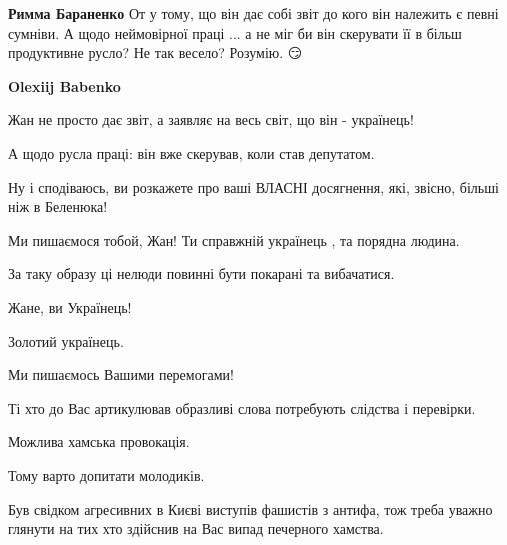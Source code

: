 \begin{itemize}
\begin{itemize}
\textbf{Римма Бараненко} От у тому, що він дає собі звіт до кого він належить є
певні сумніви. А щодо неймовірної праці ... а не міг би він скерувати її в
більш продуктивне русло? Не так весело? Розумію. 😏

 
\textbf{Olexiij Babenko} 

Жан не просто дає звіт, а заявляє на весь світ, що він - українець!

А щодо русла праці: він вже скерував, коли став депутатом.

Ну і сподіваюсь, ви розкажете про ваші ВЛАСНІ досягнення, які, звісно, більші
ніж в Беленюка!

\end{itemize}

 

Ми пишаємося тобой, Жан! Ти справжній українець , та порядна людина.

За таку образу ці нелюди повинні бути покарані та вибачатися.


 
Жане, ви Українець!

Золотий українець.

Ми пишаємось Вашими перемогами!

Ті хто до Вас артикулював образливі слова потребують слідства і перевірки.

Можлива хамська провокація.

Тому варто допитати молодиків.

Був свідком агресивних в Києві виступів фашистів з антифа, тож треба уважно
глянути на тих хто здійснив на Вас випад печерного хамства.

 


\end{itemize}
